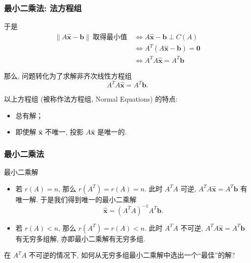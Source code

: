 
\begin{frame}
\frametitle{最小二乘法: 法方程组}

于是
\begin{align*}
\lVert A\widehat{\mathbf{x}} - \mathbf{b} \rVert ~ \text{取得最小值} ~ & \Longleftrightarrow A\widehat{\mathbf{x}} - \mathbf{b} \perp C(A) \\
& \Longleftrightarrow A^T (A\widehat{\mathbf{x}} - \mathbf{b}) = \mathbf{0} \\
& \Longleftrightarrow A^TA\widehat{\mathbf{x}} = A^T\mathbf{b}
\end{align*}

那么, 问题转化为了求解非齐次线性方程组
\[A^TA\widehat{\mathbf{x}} = A^T\mathbf{b}.\]

以上方程组 (被称作法方程组, Normal Equations) 的特点:
\begin{itemize}
\item 总有解；
\item 即使解 $\widehat{\mathbf{x}}$ 不唯一, 投影 $A\widehat{\mathbf{x}}$ 是唯一的.
\end{itemize}

\end{frame}


\begin{frame}
\frametitle{最小二乘法}

\begin{block}{最小二乘解}
\begin{itemize}
\item<1-> 若 $r(A) = n$, 那么 $r(A^T) = r(A) = n$. 此时 $A^TA$ 可逆, $A^TA\widehat{\mathbf{x}} = A^T\mathbf{b}$ 有唯一解. 于是我们得到唯一的最小二乘解
\[\widehat{\mathbf{x}} = (A^TA)^{-1}A^T\mathbf{b}.\]
\item<2-> 若 $r(A) < n$, 那么 $r(A^T) = r(A) < n$. 此时 $A^TA$ 不可逆, $A^TA\widehat{\mathbf{x}} = A^T\mathbf{b}$ 有无穷多组解, 亦即最小二乘解有无穷多组.
\end{itemize}
\end{block}

\pause
\vspace{1em}

\begin{question}
在 $A^TA$ 不可逆的情况下, 如何从无穷多组最小二乘解中选出一个``最佳''的解?
\end{question}

\end{frame}


